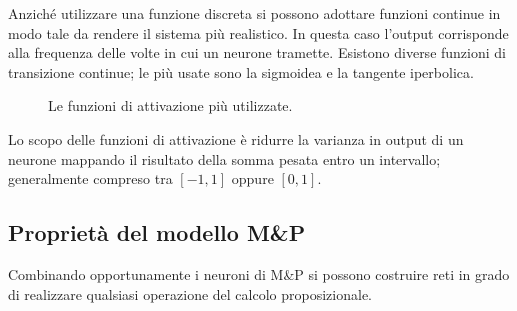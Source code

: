 Anziché utilizzare una funzione discreta si possono adottare funzioni continue in modo tale da rendere il sistema più realistico. In questa caso l'output corrisponde alla frequenza delle volte in cui un neurone tramette. Esistono diverse funzioni di transizione continue; le più usate sono la sigmoidea e la tangente iperbolica.\\

\begin{figure}[h!]
	\begin{center}
	\qquad
	\qquad
	\caption{Le funzioni di attivazione più utilizzate.}
	\end{center}
\end{figure}

Lo scopo delle funzioni di attivazione è ridurre la varianza in output di un neurone mappando il risultato della somma pesata entro un intervallo; generalmente compreso tra $[-1, 1]$ oppure $[0, 1]$.

\newpage

\subsection{Proprietà del modello M\&P} %
\label{sub:proprietà_del_modello}
Combinando opportunamente i neuroni di M\&P si possono costruire reti in grado di realizzare qualsiasi operazione del calcolo proposizionale.

